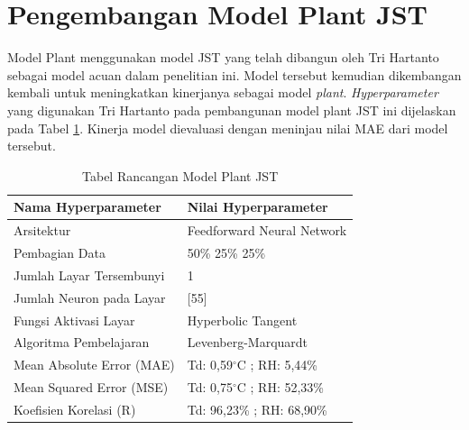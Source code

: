 \section{Pengembangan Model Plant JST}

Model Plant menggunakan model JST yang telah dibangun oleh Tri Hartanto\cite{skripsiTanto} sebagai model acuan dalam penelitian ini. Model tersebut kemudian dikembangan kembali untuk meningkatkan kinerjanya sebagai model \textit{plant}. \textit{Hyperparameter} yang digunakan Tri Hartanto pada pembangunan model plant JST ini dijelaskan pada Tabel \ref{tbl:5:NNPlantTanto}. Kinerja model dievaluasi dengan meninjau nilai MAE dari model tersebut.\\

\begin{table}[!h]
	\caption{Tabel Rancangan Model Plant JST\cite{skripsiTanto}}
	\label{tbl:5:NNPlantTanto}
	\centering
	\begin{tabular}{|p{5.7cm}|p{5cm}|}
		\hline
		\textbf{Nama Hyperparameter} & \textbf{Nilai Hyperparameter} \\ \hline
		Arsitektur & Feedforward Neural Network \\ \hline
		Pembagian Data & 50\% 25\% 25\% \\ \hline 
		Jumlah Layar Tersembunyi & 1 \\ \hline
		Jumlah Neuron pada Layar & [55] \\ \hline
		Fungsi Aktivasi Layar & Hyperbolic Tangent \\ \hline
		Algoritma Pembelajaran & Levenberg-Marquardt \\ \hline
		Mean Absolute Error (MAE) & Td: 0,59$^\circ$C ; RH: 5,44\% \\ \hline
		Mean Squared Error (MSE) & Td: 0,75$^\circ$C ; RH: 52,33\% \\ \hline
		Koefisien Korelasi (R) & Td: 96,23\% ; RH: 68,90\% \\ \hline
	\end{tabular}
\end{table}


